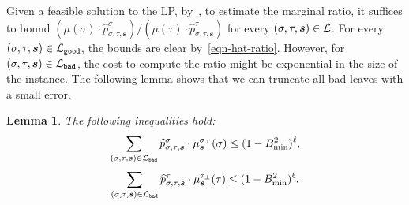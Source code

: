 \documentclass[11pt]{article}
\newtheorem{lemma}[theorem]{Lemma}
\def\!#1{\mathtt{#1}}
\newcommand{\wh}[1]{\widehat{#1}}
\newcommand{\seqS}{\boldsymbol{s}}
\newcommand{\qgl}[1]{{\color{purple}{#1}}}
\newcommand{\hktodo}[1]{{\color{blue}{#1}}}
\begin{document}


\qgl{check from here}
Given a feasible solution to the LP, by~, to estimate the marginal ratio, it suffices to bound $\left(\mu(\sigma)\cdot \wh{p}_{\sigma, \tau, \seqS}^{\sigma}\right)/\left(\mu(\tau)\cdot\wh{p}_{\sigma, \tau, \seqS}^{\tau}\right)$ for every $(\sigma, \tau, \seqS) \in \+L$. For every $(\sigma, \tau, \seqS) \in \+L_{\!{good}}$, the bounds are clear by~\eqref{eqn-hat-ratio}. However, for $(\sigma, \tau, \seqS) \in \+L_{\!{bad}}$, the cost to compute the ratio might be exponential in the size of the instance. The following lemma shows that we can truncate all bad leaves with a small error.

\hktodo{the proof}

\begin{lemma} \label{lem:LP-truncated-error}
    The following inequalities hold:
    \begin{align}\label{eqn-error1}
        \sum_{(\sigma,\tau, \seqS)\in \+L_{\!{bad}}} \widehat{p}_{\sigma,\tau, \seqS}^{\sigma}\cdot \mu^{\sigma_{\bot}}_{\seqS}(\sigma)\leq (1 - B_{\min}^2)^{\ell},
    \end{align}
    \begin{align}\label{eqn-error2}
        \sum_{(\sigma,\tau, \seqS)\in \+L_{\!{bad}}}\widehat{p}_{\sigma,\tau, \seqS}^{\tau}\cdot \mu^{\tau_{\bot}}_{\seqS}(\tau)\leq (1- B_{\min}^2)^{\ell}.
    \end{align}
\end{lemma}
\end{document}
